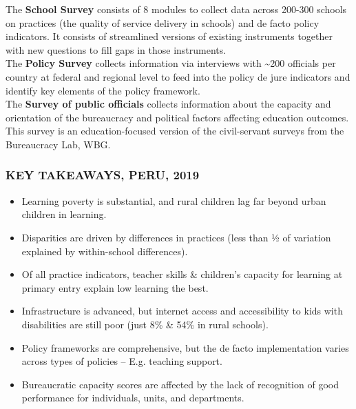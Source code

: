 \documentclass[twocolumn]{article}
\providecommand{\tightlist}{%
  \setlength{\itemsep}{0pt}\setlength{\parskip}{0pt}}
\begin{document}
The \textbf{School Survey} consists of 8 modules to collect data across
200-300 schools on practices (the quality of service delivery in
schools) and de facto policy indicators. It consists of streamlined
versions of existing instruments together with new questions to fill
gaps in those instruments.\\
The \textbf{Policy Survey} collects information via interviews with
\textasciitilde{}200 officials per country at federal and regional level
to feed into the policy de jure indicators and identify key elements of
the policy framework.\\
The \textbf{Survey of public officials} collects information about the
capacity and orientation of the bureaucracy and political factors
affecting education outcomes. This survey is an education-focused
version of the civil-servant surveys from the Bureaucracy Lab, WBG.

\hypertarget{key-takeaways-peru-2019}{%
\subsubsection{\texorpdfstring{\textbf{KEY TAKEAWAYS, PERU,
2019}}{KEY TAKEAWAYS, PERU, 2019}}\label{key-takeaways-peru-2019}}

\begin{itemize}
\tightlist
\item
  Learning poverty is substantial, and rural children lag far beyond
  urban children in learning.
\item
  Disparities are driven by differences in practices (less than ½ of
  variation explained by within-school differences).
\item
  Of all practice indicators, teacher skills \& children's capacity for
  learning at primary entry explain low learning the best.
\item
  Infrastructure is advanced, but internet access and accessibility to
  kids with disabilities are still poor (just 8\% \& 54\% in rural
  schools).
\item
  Policy frameworks are comprehensive, but the de facto implementation
  varies across types of policies -- E.g. teaching support.
\item
  Bureaucratic capacity scores are affected by the lack of recognition
  of good performance for individuals, units, and departments.
\end{itemize}

\setlength\dashlinedash{0.2pt}
\setlength\dashlinegap{1.5pt}
\setlength\arrayrulewidth{0.3pt}
\end{document}
